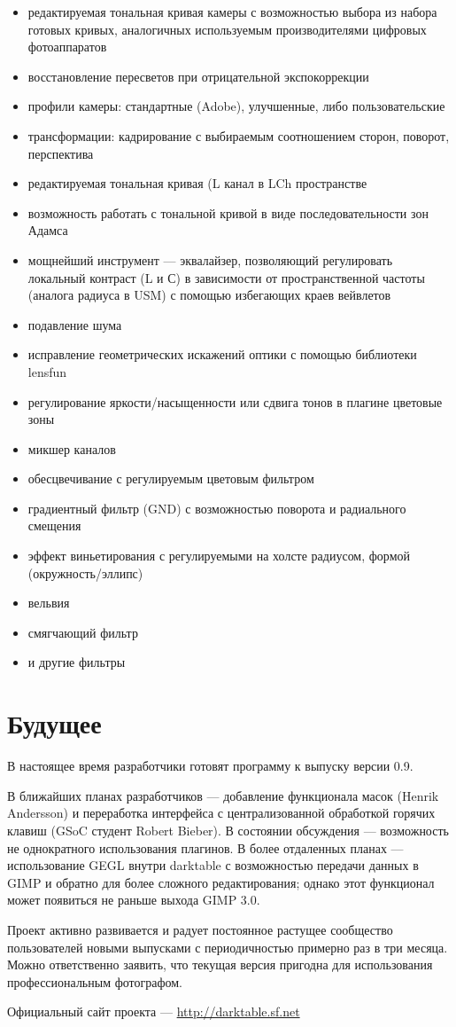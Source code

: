 \documentclass[10pt, a5paper]{article}
\begin{document}
\begin{itemize}
\item редактируемая тональная кривая камеры с возможностью выбора из набора готовых кривых, аналогичных используемым производителями цифровых фотоаппаратов
\item восстановление пересветов при отрицательной экспокоррекции
\item профили камеры: стандартные (Adobe), улучшенные, либо пользовательские
\item трансформации: кадрирование с выбираемым соотношением сторон, поворот, перспектива
\item редактируемая тональная кривая (L канал в LCh пространстве
\item возможность работать с тональной кривой в виде последовательности зон Адамса
\item мощнейший инструмент --- эквалайзер, позволяющий регулировать локальный контраст (L и С) в зависимости от пространственной частоты (аналога радиуса в USM) с помощью избегающих краев вейвлетов
\item подавление шума
\item исправление геометрических искажений оптики с помощью библиотеки lensfun
\item регулирование яркости/насыщенности или сдвига тонов в плагине цветовые зоны
\item микшер каналов
\item обесцвечивание с регулируемым цветовым фильтром
\item градиентный фильтр (GND) с возможностью поворота и радиального смещения
\item эффект виньетирования с регулируемыми на холсте радиусом, формой (окружность/эллипс)
\item вельвия
\item смягчающий фильтр
\item и другие фильтры
\end{itemize}

\section*{Будущее}
В настоящее время разработчики готовят программу к выпуску версии 0.9. 

В ближайших планах разработчиков --- добавление функционала масок (Henrik Andersson) и переработка интерфейса с централизованной обработкой горячих клавиш (GSoC студент Robert Bieber). В состоянии обсуждения — возможность не  однократного использования плагинов. В более отдаленных планах — использование GEGL внутри darktable с возможностью передачи данных в GIMP и обратно для более сложного редактирования; однако этот функционал может появиться не раньше выхода GIMP 3.0.

Проект активно развивается и радует постоянное растущее сообщество пользователей новыми выпусками с периодичностью примерно раз в три месяца. Можно ответственно заявить, что текущая версия пригодна для использования профессиональным фотографом.

\begin{thebibliography}{9}
 Официальный сайт проекта --- \url{http://darktable.sf.net}
\end{thebibliography}
\end{document}
